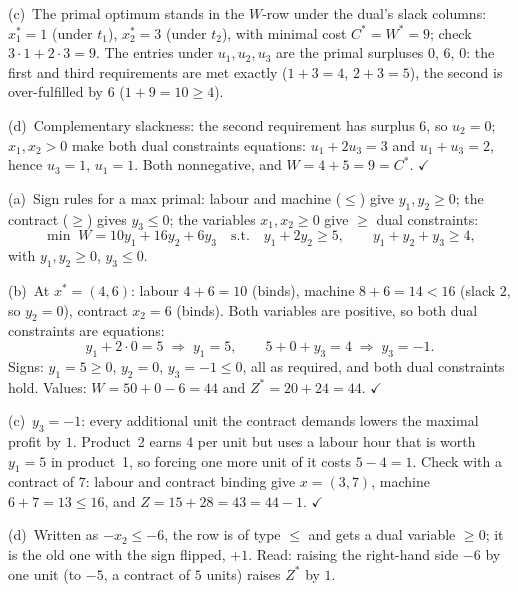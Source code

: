 \begin{solutions}
        (c)~The primal optimum stands in the $W$-row under the dual's slack
        columns: $x_{1}^{*}=1$ (under $t_{1}$), $x_{2}^{*}=3$ (under
        $t_{2}$), with minimal cost $C^{*}=W^{*}=9$; check
        $3\cdot1+2\cdot3=9$. The entries under $u_{1},u_{2},u_{3}$ are the
        primal surpluses $0$, $6$, $0$: the first and third requirements
        are met exactly ($1+3=4$, $2+3=5$), the second is over-fulfilled
        by $6$ ($1+9=10\ge 4$).

        (d)~Complementary slackness: the second requirement has surplus
        $6$, so $u_{2}=0$; $x_{1},x_{2}>0$ make both dual constraints
        equations: $u_{1}+2u_{3}=3$ and $u_{1}+u_{3}=2$, hence
        $u_{3}=1$, $u_{1}=1$. Both nonnegative, and
        $W=4+5=9=C^{*}$. $\checkmark$

  \item (a)~Sign rules for a max primal: labour and machine ($\le$) give
        $y_{1},y_{2}\ge 0$; the contract ($\ge$) gives $y_{3}\le 0$; the
        variables $x_{1},x_{2}\ge 0$ give $\ge$ dual constraints:
        \[
          \min\; W=10y_{1}+16y_{2}+6y_{3}
          \quad\text{s.t.}\quad
          y_{1}+2y_{2}\ge 5,\qquad y_{1}+y_{2}+y_{3}\ge 4,
        \]
        with $y_{1},y_{2}\ge 0$, $y_{3}\le 0$.

        (b)~At $x^{*}=(4,6)$: labour $4+6=10$ (binds), machine
        $8+6=14<16$ (slack $2$, so $y_{2}=0$), contract $x_{2}=6$ (binds).
        Both variables are positive, so both dual constraints are
        equations:
        \[
          y_{1}+2\cdot0=5\;\Rightarrow\;y_{1}=5,\qquad
          5+0+y_{3}=4\;\Rightarrow\;y_{3}=-1 .
        \]
        Signs: $y_{1}=5\ge 0$, $y_{2}=0$, $y_{3}=-1\le 0$, all as
        required, and both dual constraints hold. Values:
        $W=50+0-6=44$ and $Z^{*}=20+24=44$. $\checkmark$

        (c)~$y_{3}=-1$: every additional unit the contract demands lowers
        the maximal profit by $1$. Product~2 earns $4$ per unit but uses a
        labour hour that is worth $y_{1}=5$ in product~1, so forcing one
        more unit of it costs $5-4=1$. Check with a contract of $7$:
        labour and contract binding give $x=(3,7)$, machine $6+7=13\le 16$,
        and $Z=15+28=43=44-1$. $\checkmark$

        (d)~Written as $-x_{2}\le -6$, the row is of type $\le$ and gets a
        dual variable $\ge 0$; it is the old one with the sign flipped,
        $+1$. Read: raising the right-hand side $-6$ by one unit (to $-5$,
        a contract of $5$ units) raises $Z^{*}$ by $1$.


\end{solutions}
